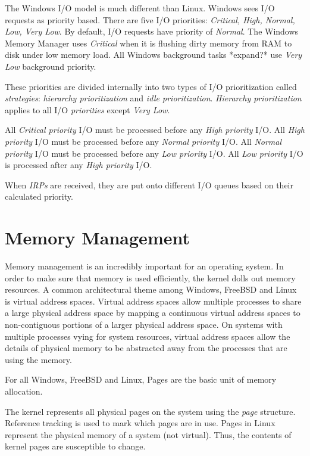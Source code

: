 \documentclass[onecolumn,10pt]{IEEETran}
\begin{document}
 The Windows I/O model is much different than Linux.  Windows sees I/O requests as priority based.  There are five I/O priorities: \textit{Critical, High, Normal, Low, Very Low}.  By default, I/O requests have priority of \textit{Normal}.  The Windows Memory Manager uses \textit{Critical} when it is flushing dirty memory from RAM to disk under low memory load.  All Windows background tasks *expand?* use \textit{Very Low} background priority.
 
 These priorities are divided internally into two types of I/O prioritization called \textit{strategies}: \textit{hierarchy prioritization} and \textit{idle prioritization}. \textit{Hierarchy prioritization} applies to all I/O \textit{priorities} except \textit{Very Low}. 

All \textit{Critical priority} I/O must be processed before any \textit{High priority} I/O.  All \textit{High priority} I/O must be processed before any \textit{Normal priority} I/O.  All \textit{Normal priority} I/O must be processed before any \textit{Low priority} I/O.  All \textit{Low priority} I/O is processed after any \textit{High priority} I/O.

When \textit{IRPs} are received, they are put onto different I/O queues based on their calculated priority.\cite{windows}

\section{Memory Management}

Memory management is an incredibly important for an operating system.  In order to make sure that memory is used efficiently, the kernel dolls out memory resources.  A common architectural theme among Windows, FreeBSD and Linux is virtual address spaces.  Virtual address spaces allow multiple processes to share a large physical address space by mapping a continuous virtual address spaces to non-contiguous portions of a larger physical address space.  On systems with multiple processes vying for system resources, virtual address spaces allow the details of physical memory to be abstracted away from the processes that are using the memory.

For all Windows, FreeBSD and Linux, Pages are the basic unit of memory allocation.

The kernel represents all physical pages on the system using the \textit{page} structure.
Reference tracking is used to mark which pages are in use.  Pages in Linux represent the physical memory of a system (not virtual).  Thus, the contents of kernel pages are susceptible to change.
\end{document}
